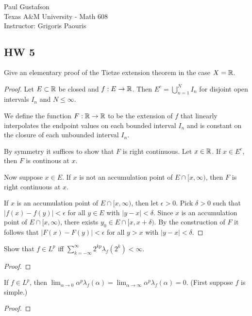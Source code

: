 \documentclass{article}
\begin{document}
\noindent Paul Gustafson\\
\noindent Texas A\&M University - Math 608 \\ 
\noindent Instructor: Grigoris Paouris

\subsection*{HW 5}
 Give an elementary proof of the Tietze extension theorem in the case $X = \mathbb{R}$.
\begin{proof}
Let $E \subset \mathbb{R}$ be closed and $f : E \to \mathbb{R}$. Then $E^c = \bigcup_{n=1}^N I_n$ for disjoint open intervals $I_n$ and $N \le \infty$.

We define the function $F:\mathbb{R} \to \mathbb{R}$ to be the extension of $f$ that linearly interpolates the endpoint values on 
each bounded interval $I_n$ and is constant on the closure of each unbounded interval $I_n$.

By symmetry it suffices to show that $F$ is right continuous. Let $x \in \mathbb{R}$. If $x \in E^c$, then $F$ is continous at $x$.  

Now suppose $x \in E$. If $x$ is not an accumulation point of $E \cap [x, \infty)$, then $F$ is right continuous at $x$.  

If $x$ is an accumulation point of $E \cap [x, \infty)$, then let $\epsilon > 0$.  Pick $\delta > 0$ such that $|f(x) - f(y)| < \epsilon$ for all $y \in E$ with $|y - x| < \delta$.
Since $x$ is an accumulation point of $E \cap [x, \infty)$, there exists $y_0 \in E \cap [x, x + \delta)$.  By the construction of $F$ it follows
 that $|F(x) - F(y)| < \epsilon$ for all $y >x$ with $|y - x| < \delta$.
\end{proof}

 Show that $f \in L^p$ iff $\sum_{k= -\infty}^\infty 2^{kp} \lambda_f(2^k) < \infty$.
\begin{proof}







\end{proof}


 If $f \in L^p$, then $\lim_{\alpha \to 0} \alpha^p \lambda_f(\alpha) = \lim_{\alpha \to \infty} \alpha^p \lambda_f(\alpha) = 0$. (First suppose $f$ is simple.)
\begin{proof}
\end{proof}
\end{document}
